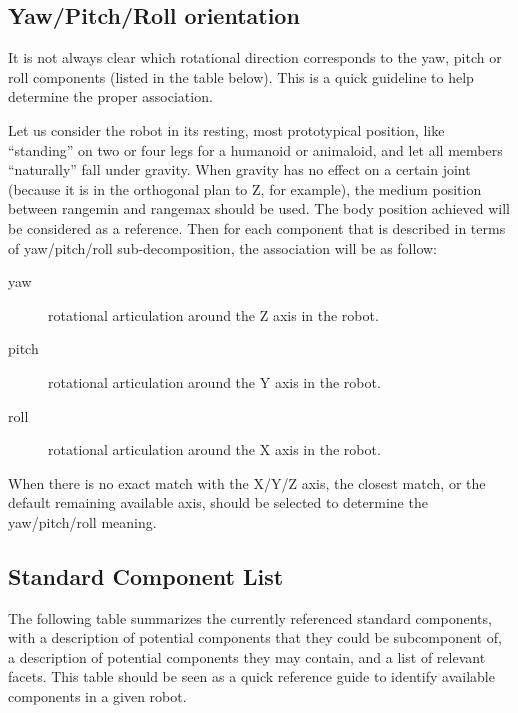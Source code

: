 \subsection{Yaw/Pitch/Roll orientation}
\label{sec:naming:ypr}

It is not always clear which rotational direction corresponds to the
yaw, pitch or roll components (listed in the table below). This is a
quick guideline to help determine the proper association.

Let us consider the robot in its resting, most prototypical position,
like ``standing'' on two or four legs for a humanoid or animaloid, and
let all members ``naturally'' fall under gravity. When gravity has no
effect on a certain joint (because it is in the orthogonal plan to Z,
for example), the medium position between rangemin and rangemax should
be used. The body position achieved will be considered as a reference.
Then for each component that is described in terms of yaw/pitch/roll
sub-decomposition, the association will be as follow:

\begin{description}
\item[yaw] rotational articulation around the Z axis in the robot.
\item[pitch] rotational articulation around the Y axis in the robot.
\item[roll] rotational articulation around the X axis in the robot.
\end{description}

When there is no exact match with the X/Y/Z axis, the closest match, or
the default remaining available axis, should be selected to determine
the yaw/pitch/roll meaning.

\subsection{Standard Component List}
\label{sec:naming:components}

The following table summarizes the currently referenced standard
components, with a description of potential components that they could
be subcomponent of, a description of potential components they may
contain, and a list of relevant facets. This table should be seen as a
quick reference guide to identify available components in a given
robot.

\newcommand{\component}[5]
{
  \lstindex{#1} &
  #5 &
  \code{#2} &
  \code{#3} &
  \code{#4}\\\hline
}

